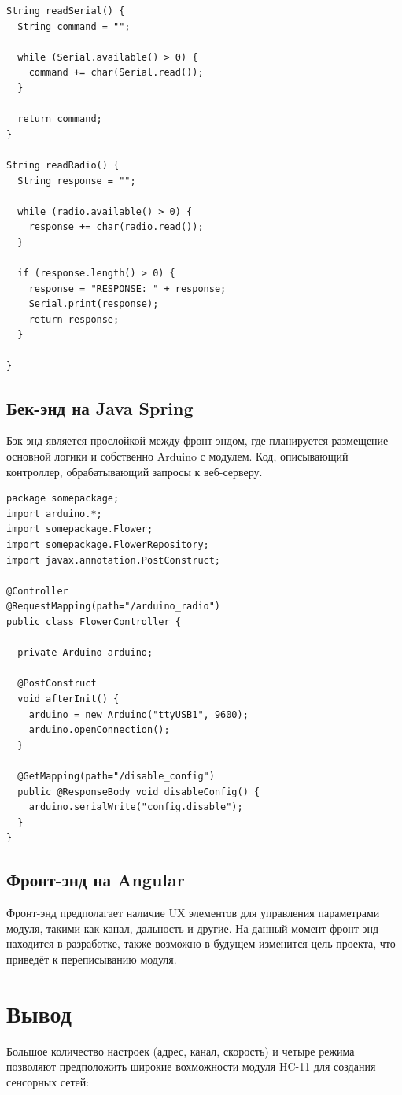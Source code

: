 \documentclass[bibliography=totocnumbered]{scrartcl}
\begin{document}
\begin{lstlisting}
String readSerial() {
  String command = "";

  while (Serial.available() > 0) {
    command += char(Serial.read());
  }

  return command;
}

String readRadio() {
  String response = "";

  while (radio.available() > 0) {
    response += char(radio.read());
  }

  if (response.length() > 0) {
    response = "RESPONSE: " + response;
    Serial.print(response);
    return response;
  }

}
\end{lstlisting} 

\subsection{Бек-энд на Java Spring}
Бэк-энд является прослойкой между фронт-эндом, где планируется размещение основной логики и собственно Arduino с модулем. Код, описывающий контроллер, обрабатывающий запросы к веб-серверу.

\begin{lstlisting}
package somepackage;
import arduino.*;
import somepackage.Flower;
import somepackage.FlowerRepository;
import javax.annotation.PostConstruct;

@Controller
@RequestMapping(path="/arduino_radio")
public class FlowerController {

  private Arduino arduino;

  @PostConstruct
  void afterInit() {
    arduino = new Arduino("ttyUSB1", 9600);
    arduino.openConnection();
  }

  @GetMapping(path="/disable_config")
  public @ResponseBody void disableConfig() {
    arduino.serialWrite("config.disable");
  }
}
\end{lstlisting}

\subsection{Фронт-энд на Angular}
Фронт-энд предполагает наличие UX элементов для управления параметрами модуля, такими как канал, дальность и другие. На данный момент фронт-энд находится в разработке, также возможно в будущем изменится цель проекта, что приведёт к переписыванию модуля.

\section{Вывод}
Большое количество настроек (адрес, канал, скорость) и четыре режима позволяют предположить широкие вохможности модуля HC-11 для создания сенсорных сетей:
 
\end{document}
